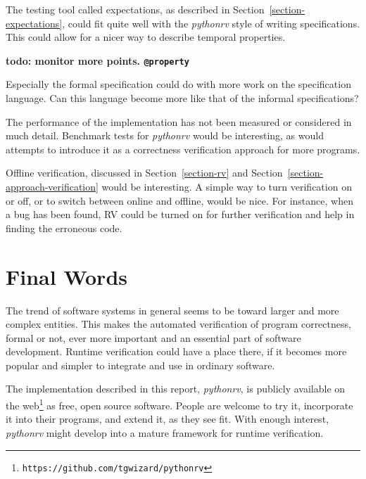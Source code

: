 \documentclass[a4paper,11pt]{kth-mag}
\theoremstyle{definition}
\newcommand{\todo}[1]{\textbf{todo: #1}}
\begin{document}
The testing tool called expectations, as described in
Section~\ref{section-expectations}, could fit quite well with the
\textit{pythonrv} style of writing specifications. This could allow for a nicer
way to describe temporal properties.

\todo{monitor more points. \texttt{@property}}

Especially the formal specification could do with more work on the
specification language. Can this language become more like that of the informal
specifications?

The performance of the implementation has not been measured or considered in
much detail. Benchmark tests for \textit{pythonrv} would be interesting, as
would attempts to introduce it as a correctness verification approach for more
programs.

Offline verification, discussed in Section~\ref{section-rv} and
Section~\ref{section-approach-verification} would be interesting. A simple way
to turn verification on or off, or to switch between online and offline, would
be nice. For instance, when a bug has been found, RV could be turned on for
further verification and help in finding the erroneous code.

\section{Final Words}

The trend of software systems in general seems to be toward larger and more
complex entities. This makes the automated verification of program
correctness, formal or not, ever more important and an essential part of
software development. Runtime verification could have a place there, if it
becomes more popular and simpler to integrate and use in ordinary software.

The implementation described in this report, \textit{pythonrv}, is publicly
available on the web\footnote{\texttt{https://github.com/tgwizard/pythonrv}} as
free, open source software. People are welcome to try it, incorporate it into
their programs, and extend it, as they see fit. With enough interest,
\textit{pythonrv} might develop into a mature framework for runtime
verification.







\end{document}
